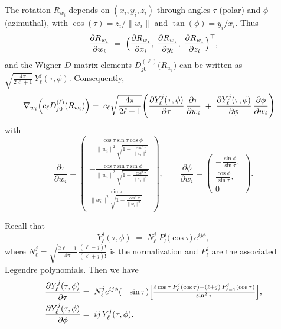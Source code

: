 \documentclass[review,onefignum,onetabnum,onealgnum]{siamart250106}
\numberwithin{theorem}{section}
\begin{document}
The rotation \(R_{w_i}\) depends on \((x_i,y_i,z_i)\) through angles \(\tau\) (polar) and \(\phi\) (azimuthal), with \(\cos(\tau)=z_i/\|w_i\|\) and \(\tan(\phi)=y_i/x_i\).  Thus
$$
\frac{\partial R_{w_i}}{\partial w_i} 
\;=\; 
\Bigl(
  \frac{\partial R_{w_i}}{\partial x_i},\;
  \frac{\partial R_{w_i}}{\partial y_i},\;
  \frac{\partial R_{w_i}}{\partial z_i}
\Bigr)^\top,
$$
and the Wigner \(D\)-matrix elements \(D_{j0}^{(\ell)}\bigl(R_{w_i}\bigr)\) can be written as 
\(\sqrt{\tfrac{4\pi}{2\ell+1}}\,Y_{\ell}^j(\tau,\phi)\). Consequently,
$$
\begin{aligned}
 \nabla_{w_i}\Bigl(c_{\ell} D_{j0}^{(\ell)}(R_{w_i})\Bigr)&=\; c_{\ell}\sqrt{\frac{4\pi}{2\ell+1}}\Biggl(
\frac{\partial Y_{\ell}^j(\tau,\phi)}{\partial \tau}\,\frac{\partial \tau}{\partial w_i} \;+\;
\frac{\partial Y_{\ell}^j(\tau,\phi)}{\partial \phi}\,\frac{\partial \phi}{\partial w_i}
\Biggr)
\end{aligned}
$$
with
$$
\frac{\partial \tau}{\partial w_i}
=
\begin{pmatrix}
-\frac{\cos\tau\sin\tau\cos\phi}{\|w_i\|^2\sqrt{1-\tfrac{\cos^2\tau}{\|w_i\|^2}}}\\[4pt]
-\frac{\cos\tau\sin\tau\sin\phi}{\|w_i\|^2\sqrt{1-\tfrac{\cos^2\tau}{\|w_i\|^2}}}\\[4pt]
\frac{\sin\tau}{\|w_i\|^2\sqrt{1-\tfrac{\cos^2\tau}{\|w_i\|^2}}}
\end{pmatrix},
\qquad
\frac{\partial \phi}{\partial w_i}
=
\begin{pmatrix}
-\frac{\sin\phi}{\sin\tau},\\[3pt]
\frac{\cos\phi}{\sin\tau},\\[3pt]
0
\end{pmatrix}.
$$


Recall that 
\[
Y_{\ell}^j(\tau,\phi) 
\;=\; 
N_{\ell}^j\;P_{\ell}^j\!\bigl(\cos\tau\bigr)\,e^{ij\phi},
\]
where \(N_{\ell}^j=\sqrt{\tfrac{2\ell+1}{4\pi}\,\tfrac{(\ell-j)!}{(\ell+j)!}}\) is the normalization and \(P_{\ell}^j\) are the associated Legendre polynomials.  Then we have
$$
\begin{aligned}
\frac{\partial Y_{\ell}^j(\tau,\phi)}{\partial \tau}
&=\; N_{\ell}^j e^{ij\phi}(-\sin\tau)\Bigl[
  \tfrac{\ell\cos\tau\,P_{\ell}^j(\cos\tau)-(\ell+j)\,P_{\ell-1}^j(\cos\tau)}{\sin^2\tau}
\Bigr],\\
\frac{\partial Y_{\ell}^j(\tau,\phi)}{\partial \phi}
&=\; ij\,Y_{\ell}^j(\tau,\phi).
\end{aligned}
$$
\end{document}
